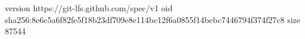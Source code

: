 version https://git-lfs.github.com/spec/v1
oid sha256:8e6c5a6f82fe5f18b23df709e8e114bc12f6a0855f14bebc7446794f374f27c8
size 87544
